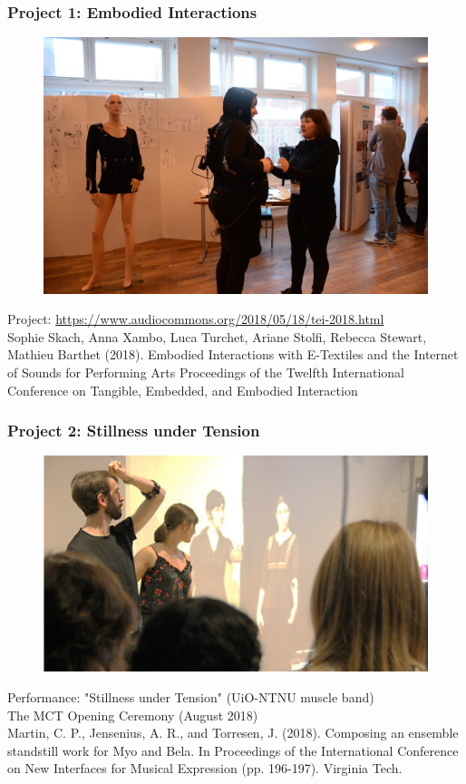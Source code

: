 \documentclass[screen, aspectratio=169]{beamer}
\begin{document}
\begin{frame}
\frametitle{Project 1: Embodied Interactions}
       \begin{figure}
	\includegraphics[scale=0.1]{img/TEI_demo_header_2018.jpg}
	\end{figure}
Project: \url{https://www.audiocommons.org/2018/05/18/tei-2018.html}\\
{\tiny Sophie Skach, Anna Xambo, Luca Turchet, Ariane Stolfi, Rebecca Stewart, Mathieu Barthet (2018). Embodied Interactions with E-Textiles and the Internet of Sounds for Performing Arts Proceedings of the Twelfth International Conference on Tangible, Embedded, and Embodied Interaction \cite{Skach.2018.embodied}}	
\end{frame}
%
\begin{frame}
\frametitle{Project 2: Stillness under Tension}
       \begin{figure}
	\includegraphics[scale=0.3]{img/Stillness-under-Tension.pdf}
	\end{figure}
Performance: "Stillness under Tension" (UiO-NTNU muscle band)\\	
The MCT Opening Ceremony (August 2018)\\
{\tiny
Martin, C. P., Jensenius, A. R., and Torresen, J. (2018). Composing an ensemble standstill work for Myo and Bela. In Proceedings of the International Conference on New Interfaces for Musical Expression (pp. 196-197). Virginia Tech. \cite{martin2018composing}
}	
\end{frame}
\end{document}
